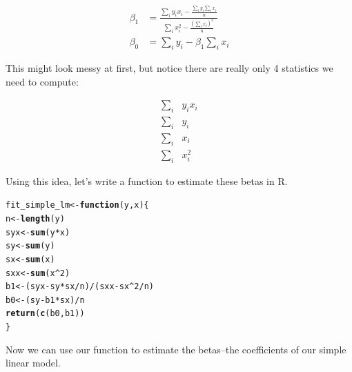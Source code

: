 \documentclass[10pt]{article}\usepackage[]{graphicx}\usepackage[]{color}
\makeatletter
\newcommand{\hlnum}[1]{\textcolor[rgb]{0.686,0.059,0.569}{#1}}%
\newcommand{\hlopt}[1]{\textcolor[rgb]{0,0,0}{#1}}%
\newcommand{\hlstd}[1]{\textcolor[rgb]{0.345,0.345,0.345}{#1}}%
\newcommand{\hlkwa}[1]{\textcolor[rgb]{0.161,0.373,0.58}{\textbf{#1}}}%
\newcommand{\hlkwb}[1]{\textcolor[rgb]{0.69,0.353,0.396}{#1}}%
\newcommand{\hlkwc}[1]{\textcolor[rgb]{0.333,0.667,0.333}{#1}}%
\newcommand{\hlkwd}[1]{\textcolor[rgb]{0.737,0.353,0.396}{\textbf{#1}}}%
\newenvironment{kframe}{%
 \def\at@end@of@kframe{}%
 \ifinner\ifhmode%
  \def\at@end@of@kframe{\end{minipage}}%
  \begin{minipage}{\columnwidth}%
 \fi\fi%
 \def\FrameCommand##1{\hskip\@totalleftmargin \hskip-\fboxsep
 \colorbox{shadecolor}{##1}\hskip-\fboxsep
     \hskip-\linewidth \hskip-\@totalleftmargin \hskip\columnwidth}%
 \MakeFramed {\advance\hsize-\width
   \@totalleftmargin\z@ \linewidth\hsize
   \@setminipage}}%
 {\par\unskip\endMakeFramed%
 \at@end@of@kframe}
\newenvironment{knitrout}{}{} %
\makeatother
\begin{document}
\begin{align}
\beta_1 &= \frac{ \sum_i y_i x_i - \frac{\sum_i y_i \sum_i x_i}{n} }{ \sum_i x_i^2 - \frac{(\sum_i x_i)^2}{n} } \\
\beta_0 &=  \sum_i y_i - \beta_1 \sum_i x_i 
\end{align}

This might look messy at first, but notice there are really only 4 statistics we need to compute: 

\begin{align}
\sum_i & y_i x_i \\
\sum_i & y_i \\
\sum_i & x_i \\
\sum_i & x_i^2
\end{align}

Using this idea, let's write a function to estimate these betas in R. 

\begin{knitrout}\small
{}\color{fgcolor}\begin{kframe}
\begin{alltt}
\hlstd{fit_simple_lm}\hlkwb{<-}\hlkwa{function}\hlstd{(}\hlkwc{y}\hlstd{,}\hlkwc{x}\hlstd{)\{}
  \hlstd{n}\hlkwb{<-}\hlkwd{length}\hlstd{(y)}
  \hlstd{syx}\hlkwb{<-}\hlkwd{sum}\hlstd{(y}\hlopt{*}\hlstd{x)}
  \hlstd{sy}\hlkwb{<-}\hlkwd{sum}\hlstd{(y)}
  \hlstd{sx}\hlkwb{<-}\hlkwd{sum}\hlstd{(x)}
  \hlstd{sxx}\hlkwb{<-}\hlkwd{sum}\hlstd{(x}\hlopt{^}\hlnum{2}\hlstd{)}
  \hlstd{b1}\hlkwb{<-} \hlstd{(syx} \hlopt{-} \hlstd{sy}\hlopt{*}\hlstd{sx}\hlopt{/}\hlstd{n)}\hlopt{/}\hlstd{(sxx} \hlopt{-} \hlstd{sx}\hlopt{^}\hlnum{2}\hlopt{/}\hlstd{n)}
  \hlstd{b0}\hlkwb{<-} \hlstd{(sy} \hlopt{-} \hlstd{b1}\hlopt{*}\hlstd{sx)}\hlopt{/}\hlstd{n}
  \hlkwd{return}\hlstd{(}\hlkwd{c}\hlstd{(b0,b1))}
\hlstd{\}}
\end{alltt}
\end{kframe}
\end{knitrout}

Now we can use our function to estimate the betas--the coefficients of our simple linear model.
\end{document}
